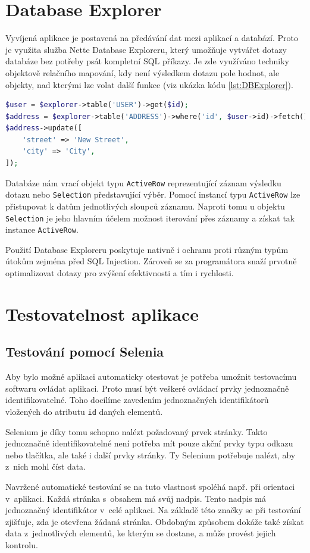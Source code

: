 \documentclass[czech,BP]{thesiskiv}
\begin{document}
		\section{Database Explorer}
		\par Vyvíjená aplikace je postavená na předávání dat mezi aplikací a databází. Proto je využita služba Nette Database Exploreru, který umožňuje vytvářet dotazy databáze bez potřeby psát kompletní SQL příkazy. Je zde využíváno techniky objektově relačního mapování, kdy není výsledkem dotazu pole hodnot, ale objekty, nad kterými lze volat další funkce (viz ukázka kódu \ref{lst:DBExplorer}).
		\begin{minipage}{\linewidth}
		\begin{lstlisting}[language=PHP, caption={Ukázka použití Nette Database Explorer},label={lst:DBExplorer}]
$user = $explorer->table('USER')->get($id);
$address = $explorer->table('ADDRESS')->where('id', $user->id)->fetch();
$address->update([
	'street' => 'New Street',
	'city' => 'City',	
]);
\end{lstlisting}
\end{minipage}
		\par Databáze nám vrací objekt typu \texttt{ActiveRow} reprezentující záznam výsledku dotazu nebo \texttt{Selection} představující výběr. Pomocí instancí typu \texttt{ActiveRow} lze přistupovat k datům jednotlivých sloupců záznamu. Naproti tomu u objektu \texttt{Selection} je jeho hlavním účelem možnost iterování přes záznamy a získat tak instance \texttt{ActiveRow}. 
		\par Použití Database Exploreru poskytuje nativně i ochranu proti různým typům útokům zejména před SQL Injection. Zároveň se za programátora snaží prvotně optimalizovat dotazy pro zvýšení efektivnosti a tím i rychlosti.
		
		\section{Testovatelnost aplikace}
		\label{sec:testovatelnost}
		\subsection{Testování pomocí Selenia}
		\par Aby bylo možné aplikaci automaticky otestovat je potřeba umožnit testovacímu softwaru ovládat aplikaci. Proto musí být veškeré ovládací prvky jednoznačně identifikovatelné. Toho docílíme zavedením jednoznačných identifikátorů vložených do atributu \texttt{id} daných elementů.
		\par Selenium je díky tomu schopno nalézt požadovaný prvek stránky. Takto jednoznačně identifikovatelné není potřeba mít pouze akční prvky typu odkazu nebo tlačítka, ale také i další prvky stránky. Ty Selenium potřebuje nalézt, aby z~nich mohl číst data.
		\par Navržené automatické testování se na tuto vlastnost spoléhá např. při orientaci v~aplikaci. Každá stránka s~obsahem má svůj nadpis. Tento nadpis má jednoznačný identifikátor v~celé aplikaci. Na základě této značky se při testování zjišťuje, zda je otevřena žádaná stránka. Obdobným způsobem dokáže také získat data z~jednotlivých elementů, ke kterým se dostane, a může provést jejich kontrolu.
		
\end{document}
